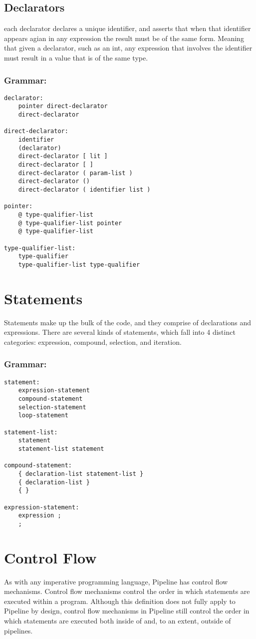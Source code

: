 \documentclass[./LRM_main.tex]{subfiles}
\begin{document}
\subsection{Declarators}
each declarator declares a unique identifier, and asserts that when that identifier appears agian in any expression the result must be of the same form. Meaning that given a declarator, such as an int, any expression that involves the identifier must result in a value that is of the same type.
\subsubsection{Grammar:}
\begin{lstlisting}
declarator:
	pointer direct-declarator
	direct-declarator

direct-declarator:
	identifier
	(declarator)
	direct-declarator [ lit ]
	direct-declarator [ ]
	direct-declarator ( param-list )
	direct-declarator ()
	direct-declarator ( identifier list )

pointer:
	@ type-qualifier-list
	@ type-qualifier-list pointer
	@ type-qualifier-list

type-qualifier-list:
	type-qualifier
	type-qualifier-list type-qualifier
\end{lstlisting}
\section{Statements}
Statements make up the bulk of the code, and they comprise of declarations and expressions. There are several kinds of statements, which fall into 4 distinct categories: expression, compound, selection, and iteration.
\subsubsection{Grammar:}
\begin{lstlisting}
statement:
	expression-statement
	compound-statement
	selection-statement
	loop-statement

statement-list:
	statement
	statement-list statement

compound-statement:
	{ declaration-list statement-list }
	{ declaration-list }
	{ }

expression-statement:
	expression ;
	;

\end{lstlisting}
\section{Control Flow}
As with any imperative programming language, Pipeline has control flow mechanisms. Control flow mechanisms control the order in which statements are executed within a program. Although this definition does not fully apply to Pipeline by design, control flow mechanisms in Pipeline still control the order in which statements are executed both inside of and, to an extent, outside of pipelines.
\end{document}
